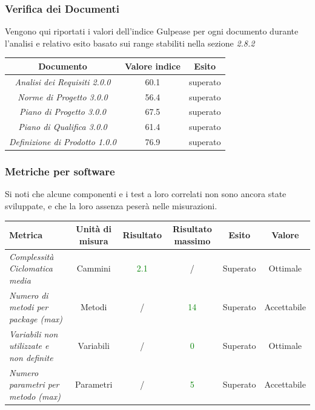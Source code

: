 {	

	
	
    


    \subsubsection{Verifica dei Documenti}
    Vengono qui riportati i valori dell'indice Gulpease per ogni documento durante l’analisi e relativo
    esito basato sui range stabiliti nella sezione \emph{2.8.2}
    \begin{center}
    	\begin{tabular}{|c|c|c|}
    		\hline
    		\textbf{Documento} & \textbf{Valore indice} & \textbf{Esito} \\
    		\hline
    		\emph{Analisi dei Requisiti 2.0.0}  & 60.1 & superato \\
    		\hline
    		\emph{Norme di Progetto 3.0.0}   & 56.4  & superato \\
    		\hline
    		\emph{Piano di Progetto 3.0.0}   & 67.5 & superato \\
    		\hline
    		\emph{Piano di Qualifica 3.0.0}   & 61.4 & superato \\
    		\hline
    		\emph{Definizione di Prodotto 1.0.0}  & 76.9 & superato \\
    		\hline
    	\end{tabular}
    \end{center}
  
  \subsubsection{Metriche per software}
  \small{
  	Si noti che alcune componenti e i test a loro correlati non sono ancora state sviluppate, e che la loro assenza peserà nelle misurazioni.}
 
  
 
  \begin{longtable}{|>{\centering}m{2cm}|c|c|c|c|c|}
  	\hline
  	\textbf{Metrica} & \textbf{Unità di misura} & \textbf{Risultato} & \textbf{Risultato massimo} & \textbf{Esito} & \textbf{Valore}\\
  	\hline
  	\endhead
  	
  
  		\emph{Complessità Ciclomatica media} & {Cammini} & \textcolor{Green}{2.1} & / & Superato & Ottimale\\ \hline
  	\emph{Numero di metodi per package (max)} & {Metodi} & / & \textcolor{Green}{14} & Superato & Accettabile\\ \hline
  	\emph{Variabili non utilizzate e non definite} & {Variabili} & / & \textcolor{Green}{0} & Superato & Ottimale\\ \hline
  	\emph{Numero parametri per metodo (max)} & {Parametri} & / & \textcolor{Green}{5} & Superato & Accettabile\\ \hline
  	

\end{longtable}}
